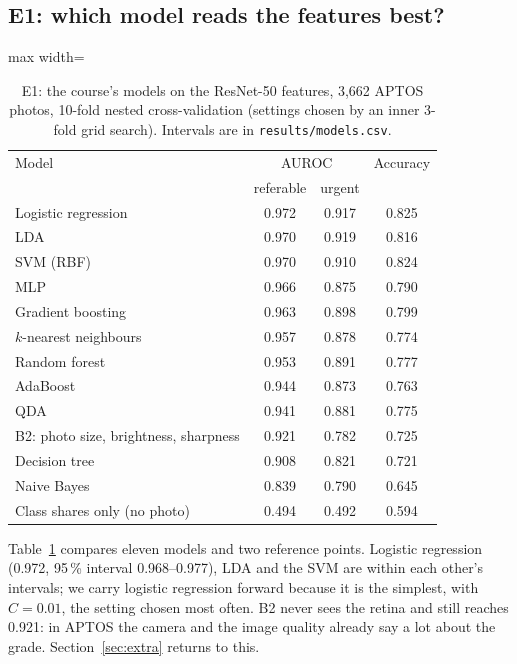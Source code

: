 \documentclass[10pt,twocolumn,letterpaper]{article}
\newcommand{\pct}{\,\%}
\begin{document}
\subsection{E1: which model reads the features best?}\label{sec:e1}
\begin{table}[t]\centering\small
\begin{adjustbox}{max width=\linewidth}\begin{tabular}{@{}lccc@{}}\toprule
Model & \multicolumn{2}{c}{AUROC} & Accuracy\\
 & referable & urgent & \\\midrule
Logistic regression & 0.972 & 0.917 & 0.825\\
LDA & 0.970 & 0.919 & 0.816\\
SVM (RBF) & 0.970 & 0.910 & 0.824\\
MLP & 0.966 & 0.875 & 0.790\\
Gradient boosting & 0.963 & 0.898 & 0.799\\
$k$-nearest neighbours & 0.957 & 0.878 & 0.774\\
Random forest & 0.953 & 0.891 & 0.777\\
AdaBoost & 0.944 & 0.873 & 0.763\\
QDA & 0.941 & 0.881 & 0.775\\
B2: photo size, brightness, sharpness & 0.921 & 0.782 & 0.725\\
Decision tree & 0.908 & 0.821 & 0.721\\
Naive Bayes & 0.839 & 0.790 & 0.645\\
Class shares only (no photo) & 0.494 & 0.492 & 0.594\\\bottomrule
\end{tabular}\end{adjustbox}
\caption{E1: the course's models on the ResNet-50 features, 3,662 APTOS photos, 10-fold nested cross-validation (settings chosen by an inner 3-fold grid search). Intervals are in \texttt{results/models.csv}.}\label{tab:e1}
\end{table}
Table~\ref{tab:e1} compares eleven models and two reference points. Logistic regression (0.972, 95\pct{} interval 0.968--0.977), LDA and the SVM are within each other's intervals; we carry logistic regression forward because it is the simplest, with $C=0.01$, the setting chosen most often. B2 never sees the retina and still reaches 0.921: in APTOS the camera and the image quality already say a lot about the grade. Section~\ref{sec:extra} returns to this.
\end{document}
